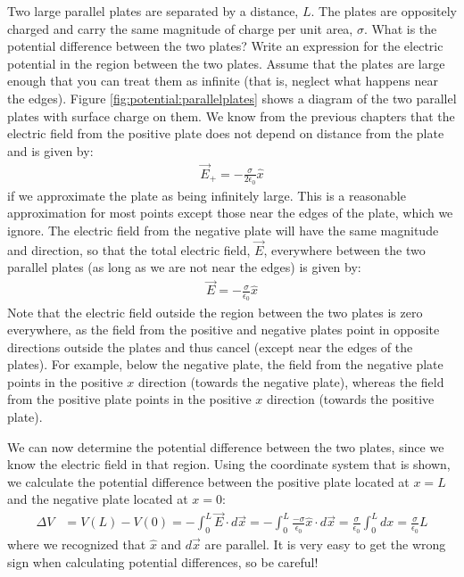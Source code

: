 \begin{example}{\label{ex:potential:parallelplates}Two large parallel plates are separated by a distance, $L$. The plates are oppositely charged and carry the same magnitude of charge per unit area, $\sigma$. What is the potential difference between the two plates? Write an expression for the electric potential in the region between the two plates. Assume that the plates are large enough that you can treat them as infinite (that is, neglect what happens near the edges).}
Figure \ref{fig:potential:parallelplates} shows a diagram of the two parallel plates with surface charge on them. 
We know from the previous chapters that the electric field from the positive plate does not depend on distance from the plate and is given by:
\begin{align*}
\vec E_+=-\frac{\sigma}{2\epsilon_0} \hat x
\end{align*}
if we approximate the plate as being infinitely large. This is a reasonable approximation for most points except those near the edges of the plate, which we ignore. The electric field from the negative plate will have the same magnitude and direction, so that the total electric field, $\vec E$, everywhere between the two parallel plates (as long as we are not near the edges) is given by:
\begin{align*}
\vec E=-\frac{\sigma}{\epsilon_0} \hat x
\end{align*}
Note that the electric field outside the region between the two plates is zero everywhere, as the field from the positive and negative plates point in opposite directions outside the plates and thus cancel (except near the edges of the plates). For example, below the negative plate, the field from the negative plate points in the positive $x$ direction (towards the negative plate), whereas the field from the positive plate points in the positive $x$ direction (towards the positive plate).

We can now determine the potential difference between the two plates, since we know the electric field in that region. Using the coordinate system that is shown, we calculate the potential difference between the positive plate located at $x=L$ and the negative plate located at $x=0$:
\begin{align*}
\Delta V &=V(L)-V(0)=- \int_0^L  \vec E\cdot d\vec x=-\int_0^L\frac{-\sigma}{\epsilon_0} \hat x \cdot d\vec x=\frac{\sigma}{\epsilon_0}\int_0^L dx=\frac{\sigma}{\epsilon_0}L
\end{align*}
where we recognized that $\hat x$ and $d\vec x$ are parallel. It is very easy to get the wrong sign when calculating potential differences, so be careful!


\end{example}
